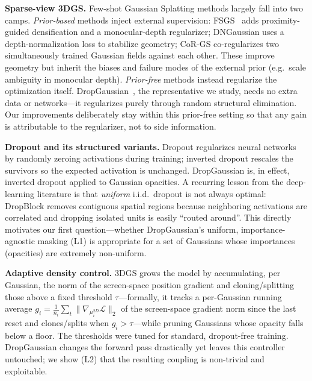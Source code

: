 \documentclass[conference]{IEEEtran}
\begin{document}
\textbf{Sparse-view 3DGS.} Few-shot Gaussian Splatting methods largely fall into two
camps. \emph{Prior-based} methods inject external supervision: FSGS~\cite{zhu2024fsgs}
adds proximity-guided densification and a monocular-depth regularizer; DNGaussian uses
a depth-normalization loss to stabilize geometry; CoR-GS co-regularizes two
simultaneously trained Gaussian fields against each other. These improve geometry but
inherit the biases and failure modes of the external prior (e.g.\ scale ambiguity in
monocular depth). \emph{Prior-free} methods instead regularize the optimization
itself. DropGaussian~\cite{park2025dropgaussian}, the representative we study, needs no
extra data or networks---it regularizes purely through random structural elimination.
Our improvements deliberately stay within this prior-free setting so that any gain is
attributable to the regularizer, not to side information.

\textbf{Dropout and its structured variants.} Dropout regularizes neural networks by
randomly zeroing activations during training; inverted dropout rescales the survivors
so the expected activation is unchanged. DropGaussian is, in effect, inverted dropout
applied to Gaussian opacities. A recurring lesson from the deep-learning literature is
that \emph{uniform} i.i.d.\ dropout is not always optimal: DropBlock removes
contiguous spatial regions because neighboring activations are correlated and dropping
isolated units is easily ``routed around''. This directly motivates our first
question---whether DropGaussian's uniform, importance-agnostic masking (L1) is
appropriate for a set of Gaussians whose importances (opacities) are extremely
non-uniform.

\textbf{Adaptive density control.} 3DGS grows the model by accumulating, per Gaussian,
the norm of the screen-space position gradient and cloning/splitting those above a
fixed threshold $\tau$---formally, it tracks a per-Gaussian running average
$g_i=\frac{1}{n_i}\sum_t\|\nabla_{\mu_i^{2D}}\mathcal{L}\|_2$ of the screen-space
gradient norm since the last reset and clones/splits when $g_i>\tau$---while pruning
Gaussians whose opacity falls below a floor. The
thresholds were tuned for standard, dropout-free training. DropGaussian changes the
forward pass drastically yet leaves this controller untouched; we show (L2) that the
resulting coupling is non-trivial and exploitable.
\end{document}
